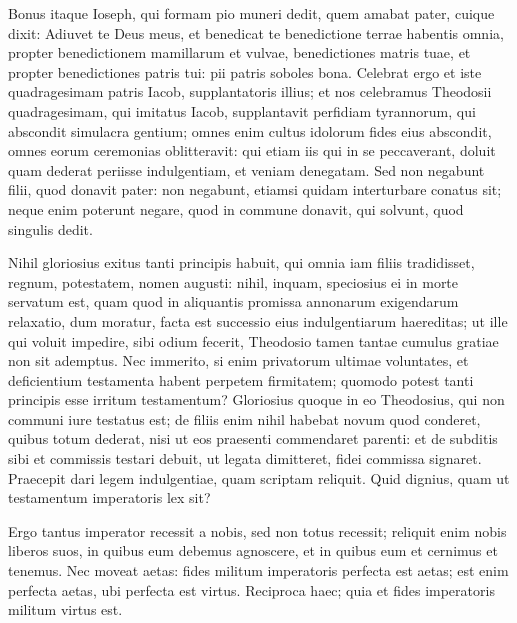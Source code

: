 Bonus itaque Ioseph, qui formam pio muneri dedit, quem amabat pater, cuique dixit: Adiuvet te Deus meus, et benedicat te benedictione terrae habentis omnia, propter benedictionem mamillarum et vulvae, benedictiones matris tuae, et propter benedictiones patris tui: pii patris soboles bona. Celebrat ergo et iste quadragesimam patris Iacob, supplantatoris illius; et nos celebramus Theodosii quadragesimam, qui imitatus Iacob, supplantavit perfidiam tyrannorum, qui abscondit simulacra gentium; omnes enim cultus idolorum fides eius abscondit, omnes eorum ceremonias oblitteravit: qui etiam iis qui in se peccaverant, doluit quam dederat periisse indulgentiam, et veniam denegatam. Sed non negabunt filii, quod donavit pater: non negabunt, etiamsi quidam interturbare conatus sit; neque enim poterunt negare, quod in commune donavit, qui solvunt, quod singulis dedit.

Nihil gloriosius exitus tanti principis habuit, qui omnia iam filiis tradidisset, regnum, potestatem, nomen augusti: nihil, inquam, speciosius ei in morte servatum est, quam quod in aliquantis promissa annonarum exigendarum relaxatio, dum moratur, facta est successio eius indulgentiarum haereditas; ut ille qui voluit impedire, sibi odium fecerit, Theodosio tamen tantae cumulus gratiae non sit ademptus. Nec immerito, si enim privatorum ultimae voluntates, et deficientium testamenta habent perpetem firmitatem; quomodo potest tanti principis esse irritum testamentum? Gloriosius quoque in eo Theodosius, qui non communi iure testatus est; de filiis enim nihil habebat novum quod conderet, quibus totum dederat, nisi ut eos praesenti commendaret parenti: et de subditis sibi et commissis testari debuit, ut legata dimitteret, fidei commissa signaret. Praecepit dari legem indulgentiae, quam scriptam reliquit. Quid dignius, quam ut testamentum imperatoris lex sit?

Ergo tantus imperator recessit a nobis, sed non totus recessit; reliquit enim nobis liberos suos, in quibus eum debemus agnoscere, et in quibus eum et cernimus et tenemus. Nec moveat aetas: fides militum imperatoris perfecta est aetas; est enim perfecta aetas, ubi perfecta est virtus. Reciproca haec; quia et fides imperatoris militum virtus est.
